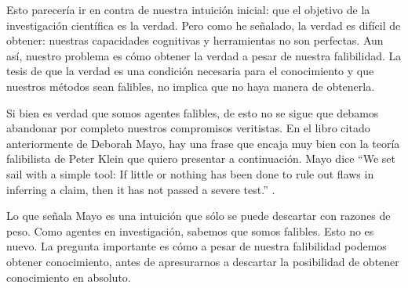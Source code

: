 \documentclass{article}
\begin{document}
Esto parecería ir en contra de nuestra intuición inicial: que el objetivo de la investigación científica es la verdad. Pero como he señalado, la verdad es difícil de obtener: nuestras capacidades cognitivas y herramientas no son perfectas. Aun así, nuestro problema es cómo obtener la verdad a pesar de nuestra falibilidad. La tesis de que la verdad es una condición necesaria para el conocimiento y que nuestros métodos sean falibles, no implica que no haya manera de obtenerla.

Si bien es verdad que somos agentes falibles, de esto no se sigue que debamos abandonar por completo nuestros compromisos veritistas. En el libro citado anteriormente de Deborah Mayo, hay una frase que encaja muy bien con la teoría falibilista de Peter Klein que quiero presentar a continuación. Mayo dice ``We set sail with a simple tool: If little or nothing has been done to rule out flaws in inferring a claim, then it has not passed a severe test.'' \cite[p.~xii]{Mayo2018}.

Lo que señala Mayo es una intuición que sólo se puede descartar con razones de peso. Como agentes en investigación, sabemos que somos falibles. Esto no es nuevo. La pregunta importante es cómo a pesar de nuestra falibilidad podemos obtener conocimiento, antes de apresurarnos a descartar la posibilidad de obtener conocimiento en absoluto.
\end{document}
